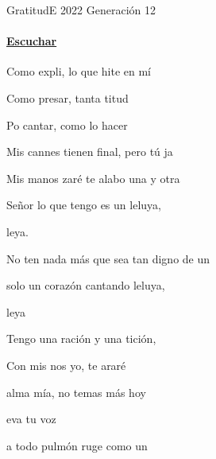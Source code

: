 \documentclass[12pt, spanish]{book}
\begin{document}
    \begin{song}{Gratitud}{E}
        {2022} %
        {Generación 12}
        {} %
        {}
        \ifChordBk
        \paragraph{\mbox{}\hfill\protect\href{https://open.spotify.com/intl-es/track/2t5BcSPWnQK1ufwNvawFHY}{Escuchar}\mbox{}\hfill}
        \fi



        \begin{SBOpGroup}
            Como expli, lo que hite en mí

            Como presar, tanta titud

            Po cantar, como lo hacer

            Mis cannes tienen final, pero tú ja
        \end{SBOpGroup}

        \begin{SBChorus}
            Mis manos zaré te alabo una y otra 

            Señor lo que tengo es un leluya,

            leya.

            No ten nada más que sea tan digno de un 

            solo un corazón cantando leluya,

            leya
        \end{SBChorus}

        \begin{SBOpGroup}
            Tengo una ración y una tición,

            Con mis nos yo, te araré
        \end{SBOpGroup}


        \begin{SBOpGroup}
             alma mía, no temas más hoy

            eva tu voz

            a todo pulmón ruge como un 


\end{SBOpGroup}
\end{song}
\end{document}
